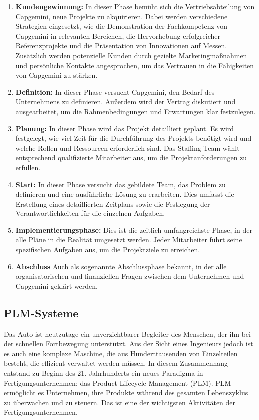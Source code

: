 \documentclass[a4paper, 12pt]{scrartcl}
\begin{document}
	\begin{enumerate}
		\item \textbf{Kundengewinnung:} In dieser Phase bemüht sich die Vertriebsabteilung von 		Capgemini, neue Projekte zu akquirieren. Dabei werden verschiedene Strategien eingesetzt, wie die Demonstration der Fachkompetenz von Capgemini in relevanten Bereichen, die Hervorhebung erfolgreicher Referenzprojekte und die Präsentation von Innovationen auf Messen. Zusätzlich werden potenzielle Kunden durch gezielte Marketingmaßnahmen und persönliche Kontakte angesprochen, um das Vertrauen in die Fähigkeiten von Capgemini zu stärken.
		\item \textbf{Definition:} In dieser Phase versucht Capgemini, den Bedarf des
		Unternehmens zu definieren. Außerdem wird der Vertrag diskutiert und ausgearbeitet, um die Rahmenbedingungen und Erwartungen klar festzulegen.
		
		\item \textbf{Planung:} In dieser Phase wird das Projekt detailliert geplant. Es wird 
		festgelegt, wie viel Zeit für die Durchführung des Projekts benötigt wird und welche Rollen und Ressourcen erforderlich sind. Das Staffing-Team wählt entsprechend qualifizierte Mitarbeiter aus, um die Projektanforderungen zu erfüllen.
		\item \textbf{Start:} In dieser Phase versucht das gebildete Team, das Problem zu definieren und eine ausführliche Lösung zu erarbeiten. Dies umfasst die Erstellung eines detaillierten Zeitplans sowie die Festlegung der Verantwortlichkeiten für die einzelnen Aufgaben.
		\item \textbf{Implementierungsphase:} Dies ist die zeitlich umfangreichste Phase, in der alle Pläne in die Realität umgesetzt werden. Jeder Mitarbeiter führt seine spezifischen Aufgaben aus, um die Projektziele zu erreichen.
		\item \textbf{Abschluss} Auch als sogenannte Abschlussphase bekannt, in der alle organisatorischen und finanziellen Fragen zwischen dem Unternehmen und Capgemini geklärt werden.
	\end{enumerate}
	\subsection{PLM-Systeme}
	Das Auto ist heutzutage ein unverzichtbarer Begleiter des Menschen, der ihn bei der schnellen Fortbewegung unterstützt. Aus der Sicht eines Ingenieurs jedoch ist es auch eine komplexe Maschine, die aus Hunderttausenden von Einzelteilen besteht, die effizient verwaltet werden müssen. In diesem Zusammenhang entstand zu Beginn des 21. Jahrhunderts ein neues Paradigma in Fertigungsunternehmen: das Product Lifecycle Management (PLM). PLM ermöglicht es Unternehmen, ihre Produkte während des gesamten Lebenszyklus zu überwachen und zu steuern. Das ist eine der wichtigsten Aktivitäten der Fertigungsunternehmen\cite{stark2011product}.
\end{document}
